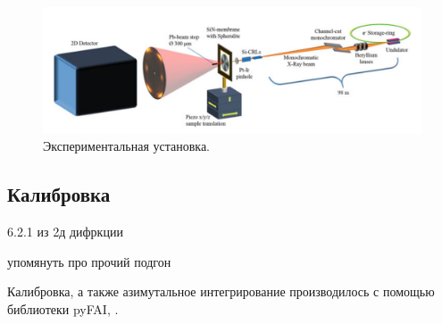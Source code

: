 \begin{figure}[h]
    \centering
    \includegraphics[width=\linewidth]{fig/ust.PNG}
    \caption{Экспериментальная установка. \cite{experiment}}
    \label{fig:experiment}
\end{figure}

\subsection{Калибровка}


 6.2.1 из 2д дифркции
 
 упомянуть про прочий подгон
 
Калибровка, а также азимутальное интегрирование производилось с помощью библиотеки pyFAI, \cite{pyfai}.




